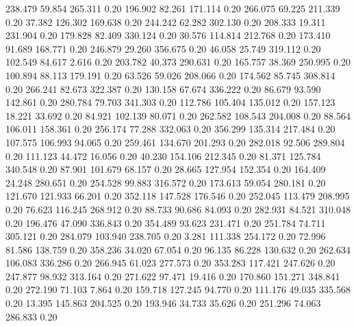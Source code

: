  238.479   59.854  265.311         0.20
 196.902   82.261  171.114         0.20
 266.075   69.225  211.339         0.20
  37.382  126.302  169.638         0.20
 244.242   62.282  302.130         0.20
 208.333   19.311  231.904         0.20
 179.828   82.409  330.124         0.20
  30.576  114.814  212.768         0.20
 173.410   91.689  168.771         0.20
 246.879   29.260  356.675         0.20
  46.058   25.749  319.112         0.20
 102.549   84.617    2.616         0.20
 203.782   40.373  290.631         0.20
 165.757   38.369  250.995         0.20
 100.894   88.113  179.191         0.20
  63.526   59.026  208.066         0.20
 174.562   85.745  308.814         0.20
 266.241   82.673  322.387         0.20
 130.158   67.674  336.222         0.20
  86.679   93.590  142.861         0.20
 280.784   79.703  341.303         0.20
 112.786  105.404  135.012         0.20
 157.123   18.221   33.692         0.20
  84.921  102.139   80.071         0.20
 262.582  108.543  204.008         0.20
  88.564  106.011  158.361         0.20
 256.174   77.288  332.063         0.20
 356.299  135.314  217.484         0.20
 107.575  106.993   94.065         0.20
 259.461  134.670  201.293         0.20
 282.018   92.506  289.804         0.20
 111.123   44.472   16.056         0.20
  40.230  154.106  212.345         0.20
  81.371  125.784  340.548         0.20
  87.901  101.679   68.157         0.20
  28.665  127.954  152.354         0.20
 164.409   24.248  280.651         0.20
 254.528   99.883  316.572         0.20
 173.613   59.054  280.181         0.20
 121.670  121.933   66.201         0.20
 352.118  147.528  176.546         0.20
 252.045  113.479  208.995         0.20
  76.623  116.245  268.912         0.20
  88.733   90.686   84.093         0.20
 282.931   84.521  310.048         0.20
 196.476   47.090  336.843         0.20
 354.489   93.623  231.471         0.20
 251.784   74.711  305.121         0.20
 284.079  103.940  238.705         0.20
   3.281  111.338  254.172         0.20
  72.996   81.586  138.759         0.20
 358.236   34.020   67.054         0.20
  96.135   86.228  130.632         0.20
 262.634  106.083  336.286         0.20
 266.945   61.023  277.573         0.20
 353.283  117.421  247.626         0.20
 247.877   98.932  313.164         0.20
 271.622   97.471   19.416         0.20
 170.860  151.271  348.841         0.20
 272.190   71.103    7.864         0.20
 159.718  127.245   94.770         0.20
 111.176   49.035  335.568         0.20
  13.395  145.863  204.525         0.20
 193.946   34.733   35.626         0.20
 251.296   74.063  286.833         0.20
